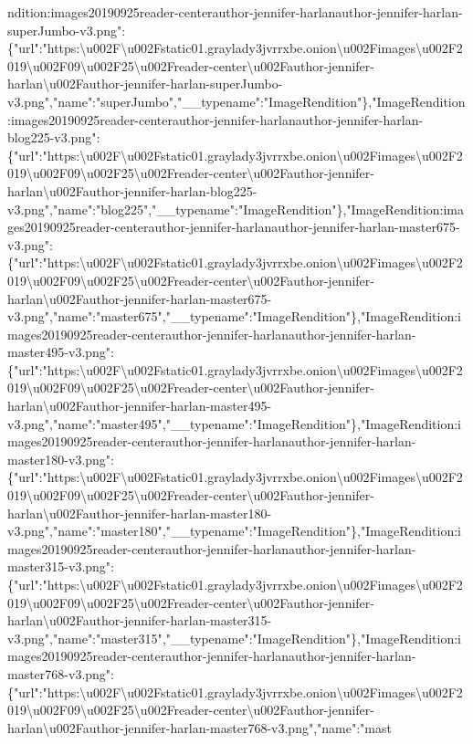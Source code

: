 ndition:images20190925reader-centerauthor-jennifer-harlanauthor-jennifer-harlan-superJumbo-v3.png":\{"url":"https:\textbackslash{}u002F\textbackslash{}u002Fstatic01.graylady3jvrrxbe.onion\textbackslash{}u002Fimages\textbackslash{}u002F2019\textbackslash{}u002F09\textbackslash{}u002F25\textbackslash{}u002Freader-center\textbackslash{}u002Fauthor-jennifer-harlan\textbackslash{}u002Fauthor-jennifer-harlan-superJumbo-v3.png","name":"superJumbo","\_\_typename":"ImageRendition"\},"ImageRendition:images20190925reader-centerauthor-jennifer-harlanauthor-jennifer-harlan-blog225-v3.png":\{"url":"https:\textbackslash{}u002F\textbackslash{}u002Fstatic01.graylady3jvrrxbe.onion\textbackslash{}u002Fimages\textbackslash{}u002F2019\textbackslash{}u002F09\textbackslash{}u002F25\textbackslash{}u002Freader-center\textbackslash{}u002Fauthor-jennifer-harlan\textbackslash{}u002Fauthor-jennifer-harlan-blog225-v3.png","name":"blog225","\_\_typename":"ImageRendition"\},"ImageRendition:images20190925reader-centerauthor-jennifer-harlanauthor-jennifer-harlan-master675-v3.png":\{"url":"https:\textbackslash{}u002F\textbackslash{}u002Fstatic01.graylady3jvrrxbe.onion\textbackslash{}u002Fimages\textbackslash{}u002F2019\textbackslash{}u002F09\textbackslash{}u002F25\textbackslash{}u002Freader-center\textbackslash{}u002Fauthor-jennifer-harlan\textbackslash{}u002Fauthor-jennifer-harlan-master675-v3.png","name":"master675","\_\_typename":"ImageRendition"\},"ImageRendition:images20190925reader-centerauthor-jennifer-harlanauthor-jennifer-harlan-master495-v3.png":\{"url":"https:\textbackslash{}u002F\textbackslash{}u002Fstatic01.graylady3jvrrxbe.onion\textbackslash{}u002Fimages\textbackslash{}u002F2019\textbackslash{}u002F09\textbackslash{}u002F25\textbackslash{}u002Freader-center\textbackslash{}u002Fauthor-jennifer-harlan\textbackslash{}u002Fauthor-jennifer-harlan-master495-v3.png","name":"master495","\_\_typename":"ImageRendition"\},"ImageRendition:images20190925reader-centerauthor-jennifer-harlanauthor-jennifer-harlan-master180-v3.png":\{"url":"https:\textbackslash{}u002F\textbackslash{}u002Fstatic01.graylady3jvrrxbe.onion\textbackslash{}u002Fimages\textbackslash{}u002F2019\textbackslash{}u002F09\textbackslash{}u002F25\textbackslash{}u002Freader-center\textbackslash{}u002Fauthor-jennifer-harlan\textbackslash{}u002Fauthor-jennifer-harlan-master180-v3.png","name":"master180","\_\_typename":"ImageRendition"\},"ImageRendition:images20190925reader-centerauthor-jennifer-harlanauthor-jennifer-harlan-master315-v3.png":\{"url":"https:\textbackslash{}u002F\textbackslash{}u002Fstatic01.graylady3jvrrxbe.onion\textbackslash{}u002Fimages\textbackslash{}u002F2019\textbackslash{}u002F09\textbackslash{}u002F25\textbackslash{}u002Freader-center\textbackslash{}u002Fauthor-jennifer-harlan\textbackslash{}u002Fauthor-jennifer-harlan-master315-v3.png","name":"master315","\_\_typename":"ImageRendition"\},"ImageRendition:images20190925reader-centerauthor-jennifer-harlanauthor-jennifer-harlan-master768-v3.png":\{"url":"https:\textbackslash{}u002F\textbackslash{}u002Fstatic01.graylady3jvrrxbe.onion\textbackslash{}u002Fimages\textbackslash{}u002F2019\textbackslash{}u002F09\textbackslash{}u002F25\textbackslash{}u002Freader-center\textbackslash{}u002Fauthor-jennifer-harlan\textbackslash{}u002Fauthor-jennifer-harlan-master768-v3.png","name":"mast